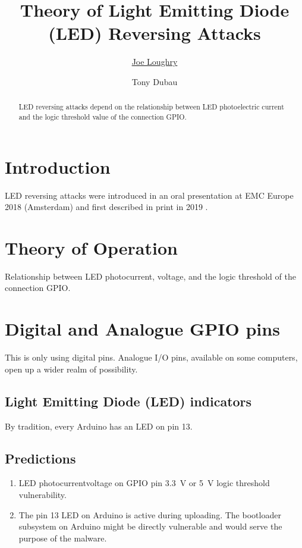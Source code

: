 \documentclass[a4paper,notitlepage]{article}
\begin{document}
\title{Theory of Light Emitting Diode (LED) Reversing Attacks}
\author[1]{\href{mailto:joe.loughry@cs.du.edu}{Joe Loughry}}
\author[2]{Tony Dubau}
\maketitle
\begin{abstract}
  LED reversing attacks depend on the relationship between LED photoelectric
  current and the logic threshold value of the connection GPIO.
\end{abstract}
\maketitle
\section{Introduction}
LED reversing attacks were introduced in an oral presentation at EMC Europe
2018 (Amsterdam) and first described in print in 2019 \cite{Loughry2019}.
\section{Theory of Operation}
Relationship between LED photocurrent, voltage, and the logic threshold of the
connection GPIO.
\section{Digital and Analogue GPIO pins}
This is only using digital pins. Analogue I/O pins, available on some
computers, open up a wider realm of possibility.
\subsection{Light Emitting Diode (LED) indicators}
By tradition, every Arduino has an LED on pin 13.
\subsection{Predictions}
\begin{enumerate}
  \item LED photocurrent\textrightarrow voltage on GPIO pin\textrightarrow
    \SI{3.3}{\volt} or \SI{5}{\volt} logic threshold\textrightarrow
    vulnerability.
  \item The pin 13 LED on Arduino is active during uploading. The bootloader
    subsystem on Arduino might be directly vulnerable and would serve the
    purpose of the malware.
\end{enumerate}
\end{document}
